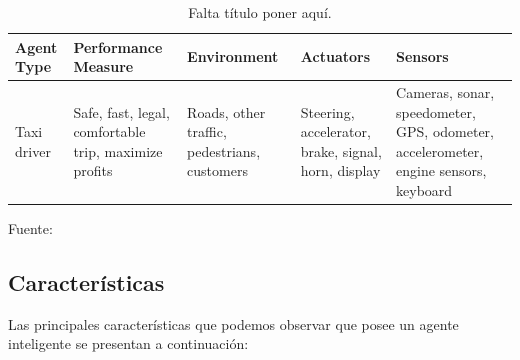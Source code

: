\begin{table}[ht!]
\centering
\caption{Falta título poner aquí.} \vskip 0.1cm
\begin{tabular}{|p{2.5cm} ||p{3cm} |p{2.9cm} |p{2.8cm} |p{3.3cm}|}  \hline 
\bf Agent Type & \bf Performance Measure & \bf Environment & \bf Actuators & \bf Sensors \\ \hline 
Taxi driver & Safe, fast, legal, comfortable trip, maximize profits & Roads, other traffic, pedestrians, customers & Steering, accelerator, brake, signal, horn, display & Cameras, sonar, speedometer, GPS, odometer, accelerometer, engine sensors, keyboard \\ \hline
\end{tabular} 
\begin{center}
{\small{Fuente: \cite{FALTA}}}
\end{center}
\end{table}

\subsection{Características}
Las principales características que podemos observar que  posee un agente inteligente se presentan a continuación:

